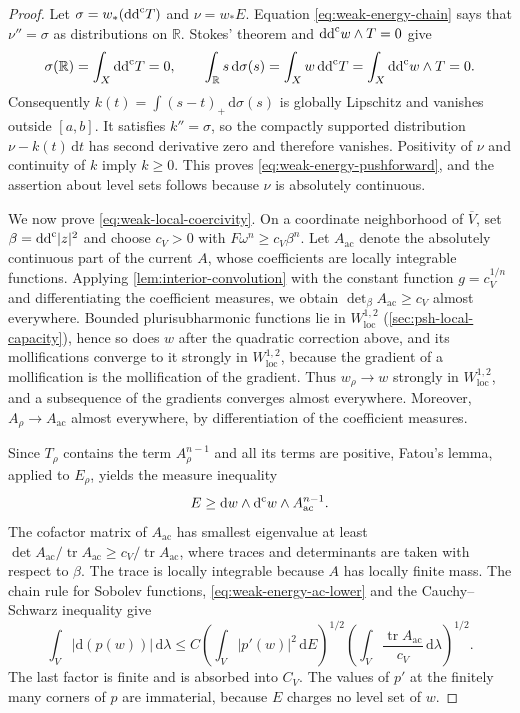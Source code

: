 \begin{proof}
Let $\sigma=w_*(\mathrm{dd}^{\mathrm{c}} T)$ and $\nu=w_*E$. Equation \eqref{eq:weak-energy-chain} says that $\nu''=\sigma$ as distributions on $\mathbb R$. Stokes' theorem and $\mathrm{dd}^{\mathrm{c}} w\wedge T=0$ give
\[
\sigma(\mathbb R)=\int_X\mathrm{dd}^{\mathrm{c}} T=0,\qquad
\int_{\mathbb R}s\,\mathrm{d}\sigma(s)=\int_Xw\,\mathrm{dd}^{\mathrm{c}} T=\int_X\mathrm{dd}^{\mathrm{c}} w\wedge T=0.
\]
Consequently $k(t)=\int(s-t)_+\,\mathrm{d}\sigma(s)$ is globally Lipschitz and vanishes outside $[a,b]$. It satisfies $k''=\sigma$, so the compactly supported distribution $\nu-k(t)\,\mathrm{d} t$ has second derivative zero and therefore vanishes. Positivity of $\nu$ and continuity of $k$ imply $k\geq0$. This proves \eqref{eq:weak-energy-pushforward}, and the assertion about level sets follows because $\nu$ is absolutely continuous.

We now prove \eqref{eq:weak-local-coercivity}. On a coordinate neighborhood of $\overline V$, set $\beta=\mathrm{dd}^{\mathrm{c}}|z|^2$ and choose $c_V>0$ with $F\omega^n\geq c_V\beta^n$. Let $A_{\mathrm{ac}}$ denote the absolutely continuous part of the current $A$, whose coefficients are locally integrable functions. Applying \cref{lem:interior-convolution} with the constant function $g=c_V^{1/n}$ and differentiating the coefficient measures, we obtain $\det_\beta A_{\mathrm{ac}}\geq c_V$ almost everywhere. Bounded plurisubharmonic functions lie in $W^{1,2}_{\mathrm{loc}}$ (\cref{sec:psh-local-capacity}), hence so does $w$ after the quadratic correction above, and its mollifications converge to it strongly in $W^{1,2}_{\mathrm{loc}}$, because the gradient of a mollification is the mollification of the gradient. Thus $w_\rho\to w$ strongly in $W^{1,2}_{\mathrm{loc}}$, and a subsequence of the gradients converges almost everywhere. Moreover, $A_\rho\to A_{\mathrm{ac}}$ almost everywhere, by differentiation of the coefficient measures.

Since $T_\rho$ contains the term $A_\rho^{n-1}$ and all its terms are positive, Fatou's lemma, applied to $E_\rho$, yields the measure inequality
\begin{equation}\label{eq:weak-energy-ac-lower}
E\geq\mathrm{d} w\wedge\mathrm d^{\mathrm c} w\wedge A_{\mathrm{ac}}^{n-1}.
\end{equation}
The cofactor matrix of $A_{\mathrm{ac}}$ has smallest eigenvalue at least $\det A_{\mathrm{ac}}/\operatorname{tr}A_{\mathrm{ac}}\geq c_V/\operatorname{tr}A_{\mathrm{ac}}$, where traces and determinants are taken with respect to $\beta$. The trace is locally integrable because $A$ has locally finite mass. The chain rule for Sobolev functions, \eqref{eq:weak-energy-ac-lower} and the Cauchy--Schwarz inequality give
\[
\int_V|\mathrm{d}(p(w))|\,\mathrm{d}\lambda
\leq C\left(\int_V|p'(w)|^2\,\mathrm{d} E\right)^{1/2}
\left(\int_V\frac{\operatorname{tr}A_{\mathrm{ac}}}{c_V}\,\mathrm{d}\lambda\right)^{1/2}.
\]
The last factor is finite and is absorbed into $C_V$. The values of $p'$ at the finitely many corners of $p$ are immaterial, because $E$ charges no level set of $w$.
\end{proof}

